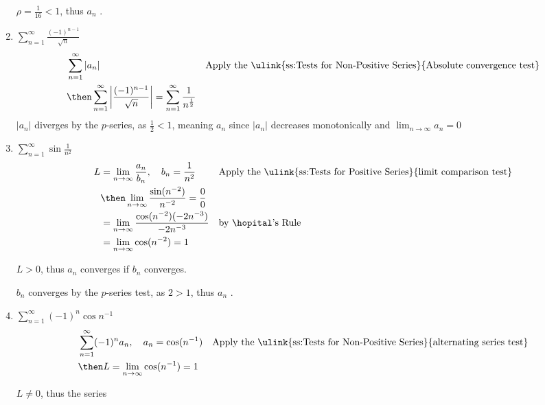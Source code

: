 \begin{enumerate}[itemsep=12em]
  \(\rho = \frac{1}{16} < 1 \), thus \(a_n\) .

  \item \(\displaystyle \sum_{n=1}^{\infty} \frac{(-1)^{n-1}}{\sqrt{n} }  \)
    \begin{align*}
      &\sum_{n=1}^{\infty} \left| a_n \right|
           && \text{Apply the \ulink{ss:Tests for Non-Positive Series}{Absolute convergence test}} \\
           &\then \sum_{n=1}^{\infty} \left|  \frac{(-1)^{n-1}}{\sqrt{n} }\right|
           = \sum_{n=1}^{\infty} \frac{1}{n^{\frac{1}{2}} }
    \end{align*}
    \(|a_n|\) diverges by the \(p\)-series, as \(\frac{1}{2} < 1\), meaning
    \(a_n\)  since \(|a_n|\) decreases monotonically and
    \(\lim_{n \to \infty} a_n = 0\)

  \vspace{-96pt}
  \item \(\displaystyle \sum_{n=1}^{\infty} \sin \frac{1}{n^2}  \)
    \begin{align*}
     L &= \lim_{n \to \infty} \frac{a_n}{b_n}, \quad b_n = \frac{1}{n^2}
       && \text{Apply the \ulink{ss:Tests for Positive Series}{limit comparison test}} \\
       &\then \lim_{n \to \infty} \frac{\sin(n^{-2})}{n^{-2}} =  \frac{0}{0} \\
       &= \lim_{n \to \infty} \frac{\cos (n^{-2})(-2n^{-3})}{-2n^{-3}}
       && \text{by \hopital's Rule} \\
       &= \lim_{n \to \infty} \cos (n^{-2}) = 1
    \end{align*}

    \(L > 0\), thus \(a_n\) converges if \(b_n\) converges.

    \(b_n\) converges by the \(p\)-series test, as \(2 > 1\), thus
    \(a_n\) .

  \vspace{-80pt}
  \item \(\displaystyle \sum_{n=1}^{\infty} (-1)^n \cos n^{-1} \)
    \begin{align*}
      &\sum_{n=1}^{\infty} (-1)^n a_n, \quad a_n = \cos (n^{-1})
      && \text{Apply the \ulink{ss:Tests for Non-Positive Series}{alternating series test}} \\
      &\then L = \lim_{n \to \infty} \cos (n^{-1}) = 1
    \end{align*}

    \(L \neq 0\), thus the series 


\end{enumerate}
